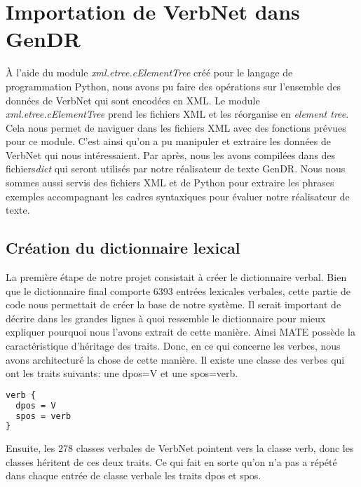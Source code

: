 \chapter{Importation de VerbNet dans GenDR}\label{python}


À l'aide du module \emph{xml.etree.cElementTree} créé pour le langage de programmation Python, nous avons pu faire des opérations sur l'ensemble des données de VerbNet qui sont encodées en XML. Le module \emph{xml.etree.cElementTree} prend les fichiers XML et les réorganise en \emph{element tree}. Cela nous permet de naviguer dans les fichiers XML avec des fonctions prévues pour ce module. C'est ainsi qu'on a pu manipuler et extraire les données de VerbNet qui nous intéressaient. Par après, nous les avons compilées dans des fichiers\emph{dict} qui seront utilisés par notre réalisateur de texte GenDR. Nous nous sommes aussi servis des fichiers XML et de Python pour extraire les phrases exemples accompagnant les cadres syntaxiques pour évaluer notre réalisateur de texte.

\section{Création du dictionnaire lexical}

La première étape de notre projet consistait à créer le dictionnaire verbal. Bien que le dictionnaire final comporte 6393 entrées lexicales verbales, cette partie de code nous permettait de créer la base de notre système. Il serait important de décrire dans les grandes lignes à quoi ressemble le dictionnaire pour mieux expliquer pourquoi nous l'avons extrait de cette manière. Ainsi MATE possède la caractéristique d'héritage des traits. Donc, en ce qui concerne les verbes, nous avons architecturé la chose de cette manière. Il existe une classe des verbes qui ont les traits suivants: une dpos=V et une spos=verb.

\begin{lstlisting}[language=XML]
verb {
  dpos = V
  spos = verb
}
\end{lstlisting}

Ensuite, les 278 classes verbales de VerbNet pointent vers la classe verb, donc les classes héritent de ces deux traits. Ce qui fait en sorte qu'on n'a pas a répété dans chaque entrée de classe verbale les traits dpos et spos. 


